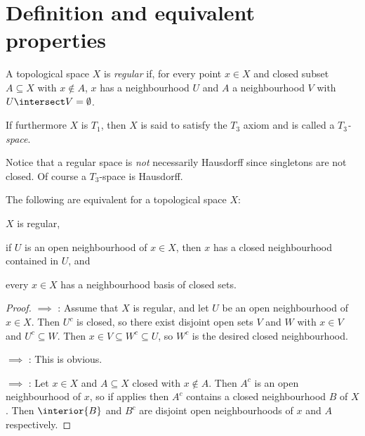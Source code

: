 \documentclass[article, a4paper, 11pt, oneside]{memoir}
\numberwithin{equation}{chapter}
\begin{document}
\section{Definition and equivalent properties}

\begin{definition}
    A topological space $X$ is \emph{regular} if, for every point $x \in X$ and closed subset $A \subseteq X$ with $x \not\in A$, $x$ has a neighbourhood $U$ and $A$ a neighbourhood $V$ with $U \intersect V = \emptyset$.

    If furthermore $X$ is $T_1$, then $X$ is said to satisfy the $T_3$ axiom and is called a \emph{$T_3$-space}.
\end{definition}
%
Notice that a regular space is \emph{not} necessarily Hausdorff since singletons are not closed. Of course a $T_3$-space is Hausdorff.


\begin{proposition}
    \label{thm:regular-equivalent-properties}
    The following are equivalent for a topological space $X$:
    \begin{enumprop}
        \item \label{enum:regular-space} $X$ is regular,

        \item \label{enum:closed-nhood-inside-nhood} if $U$ is an open neighbourhood of $x \in X$, then $x$ has a closed neighbourhood contained in $U$, and

        \item \label{enum:nhood-basis-of-closed-sets} every $x \in X$ has a neighbourhood basis of closed sets.
    \end{enumprop}
\end{proposition}

\begin{proof}
     $\implies$ : Assume that $X$ is regular, and let $U$ be an open neighbourhood of $x \in X$. Then $U^c$ is closed, so there exist disjoint open sets $V$ and $W$ with $x \in V$ and $U^c \subseteq W$. Then $x \in V \subseteq W^c \subseteq U$, so $W^c$ is the desired closed neighbourhood.

     $\implies$ : This is obvious.

     $\implies$ : Let $x \in X$ and $A \subseteq X$ closed with $x \not\in A$. Then $A^c$ is an open neighbourhood of $x$, so if  applies then $A^c$ contains a closed neighbourhood $B$ of $X$. Then $\interior{B}$ and $B^c$ are disjoint open neighbourhoods of $x$ and $A$ respectively.
\end{proof}
\end{document}
